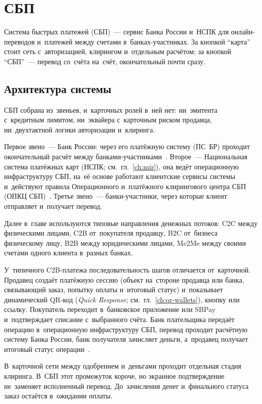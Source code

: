 
\chapter{СБП}\label{ch:sbp}
Система быстрых платежей (СБП)~--- сервис Банка России и~НСПК для
онлайн-переводов и~платежей между счетами в~банках-участниках. За кнопкой
\enquote{карта} стоит сеть с~авторизацией, клирингом и~отдельным расчётом; за
кнопкой \enquote{СБП}~--- перевод со~счёта на~счёт, окончательный почти сразу.

\section{Архитектура системы}\label{sec:sbp-architecture}

СБП собрана из~звеньев, и~карточных ролей в~ней нет: ни~эмитента
с~кредитным лимитом, ни~эквайера с~карточным риском продавца, ни~двухтактной
логики авторизации и~клиринга.

Первое звено~--- Банк России: через его платёжную систему (ПС~БР)
проходит окончательный расчёт между банками-участниками~\cite{cbr-ps}.
Второе~--- Национальная система платёжных карт (НСПК; см.~гл.~\ref{ch:mir}), она
ведёт операционную инфраструктуру СБП, на~её основе работают клиентские сервисы
системы и~действуют правила Операционного и~платёжного клирингового центра СБП (ОПКЦ
СБП)~\cite{sbp-faq-general,cbr-sbp-actions}. Третье звено~--- банки-участники,
через которые клиент отправляет и~получает перевод.

Далее в~главе используются типовые направления денежных потоков: C2C между
физическими лицами, C2B от~покупателя продавцу, B2C от~бизнеса физическому лицу,
B2B между юридическими лицами, Me2Me между своими счетами одного клиента
в~разных банках.

У~типичного C2B-платежа последовательность шагов
отличается от~карточной. Продавец создаёт платёжную сессию (объект на~стороне
продавца или банка, связывающий заказ, попытку оплаты и~итоговый статус)
и~показывает динамический QR-код (\textit{Quick Response}; см.~гл.~\ref{ch:qr-wallets}),
кнопку или ссылку. Покупатель переходит в~банковское приложение или SBPay
и~подтверждает списание с~выбранного счёта. Банк плательщика передаёт операцию
в~операционную инфраструктуру СБП, перевод
проходит расчётную систему Банка России, банк получателя зачисляет деньги,
а~продавец получает итоговый статус
операции~\cite{cbr-ps,cbr-sbp-actions,sbp-faq-business,sbpay-app}.

В~карточной сети между одобрением и~деньгами проходит отдельная стадия
клиринга. В~СБП этот промежуток короче, но экранное подтверждение не~заменяет
исполненный перевод. До~зачисления денег и~финального статуса заказ остаётся
в~ожидании оплаты.

